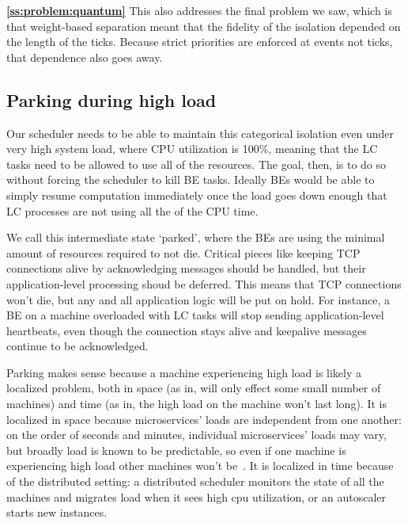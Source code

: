 \textbf{\autoref{ss:problem:quantum}} This also addresses the final problem we
saw, which is that weight-based separation meant that the fidelity of the
isolation depended on the length of the ticks. Because strict priorities are
enforced at events not ticks, that dependence also goes away.

\subsection{Parking during high load}\label{ss:approach:parking}

Our scheduler needs to be able to maintain this categorical isolation even under
very high system load, where CPU utilization is 100\%, meaning that the LC tasks
need to be allowed to use all of the resources. The goal, then, is to do so
without forcing the scheduler to kill BE tasks. Ideally BEs would be able to
simply resume computation immediately once the load goes down enough that LC
processes are not using all the of the CPU time.

We call this intermediate state `parked', where the BEs are using the minimal
amount of resources required to not die. Critical pieces like keeping TCP
connections alive by acknowledging messages should be handled, but their
application-level processing shoud be deferred. This means that TCP connections
won't die, but any and all application logic will be put on hold. For instance, a
BE on a machine overloaded with LC tasks will stop sending application-level
heartbeats, even though the connection stays alive and keepalive messages
continue to be acknowledged.

Parking makes sense because a machine experiencing high load is likely a
localized problem, both in space (as in, will only effect some small number of
machines) and time (as in, the high load on the machine won't last long). It is
localized in space because microservices' loads are independent from one
another: on the order of seconds and minutes, individual microservices' loads
may vary, but broadly load is known to be predictable, so even if one machine is
experiencing high load other machines won't be~\cite{TODO}. It is localized in
time because of the distributed setting: a distributed scheduler monitors the
state of all the machines and migrates load when it sees high cpu utilization,
or an autoscaler starts new instances.